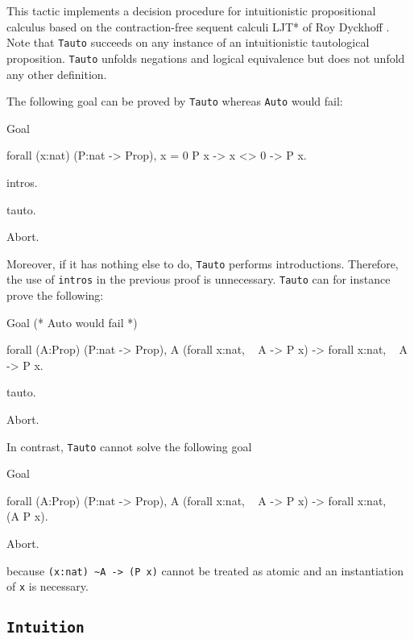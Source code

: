 This tactic implements a decision procedure for intuitionistic propositional
calculus based on the contraction-free sequent calculi LJT* of Roy Dyckhoff
\cite{Dyc92}. Note that {\tt Tauto} succeeds on any instance of an
intuitionistic tautological proposition. {\tt Tauto} unfolds negations
and logical equivalence but does not unfold any other definition.

The following goal can be proved by {\tt Tauto} whereas {\tt Auto}
would fail:

\begin{coq_example}
Goal

  forall (x:nat) (P:nat -> Prop), x = 0 \/ P x -> x <> 0 -> P x.

  intros.

  tauto.
\end{coq_example}
\begin{coq_eval}
Abort.
\end{coq_eval}

Moreover, if it has nothing else to do, {\tt Tauto} performs
introductions. Therefore, the use of {\tt intros} in the previous
proof is unnecessary. {\tt Tauto} can for instance prove the
following:
\begin{coq_example}
Goal
 (* Auto would fail *)
  
  forall (A:Prop) (P:nat -> Prop),
    A \/ (forall x:nat, ~ A -> P x) -> forall x:nat, ~ A -> P x.

  tauto.
\end{coq_example}
\begin{coq_eval}
Abort.
\end{coq_eval}

\Rem In contrast, {\tt Tauto} cannot solve the following goal

\begin{coq_example*}
Goal

  forall (A:Prop) (P:nat -> Prop),
    A \/ (forall x:nat, ~ A -> P x) -> forall x:nat, ~ ~ (A \/ P x).
\end{coq_example*}
\begin{coq_eval}
Abort.
\end{coq_eval}

because \verb=(x:nat) ~A -> (P x)= cannot be treated as atomic and an
instantiation of \verb=x= is necessary.

\subsection{\tt Intuition {\tac}}
\label{Intuition}

